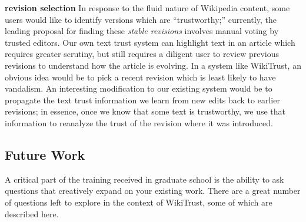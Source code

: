 \textbf{revision selection}
   In response to the fluid nature of Wikipedia content,
    some users would like to identify versions which
    are ``trustworthy;'' currently, the leading proposal
    for finding these \textit{stable revisions}
    involves manual voting by trusted editors.
    Our own text trust system can highlight text in
    an article which requires greater scrutiny, but
    still requires a diligent user to review previous
    revisions to understand how the article is evolving.
    In a system like WikiTrust, an obvious idea would be to pick
    a recent revision which is least likely to have vandalism.
    An interesting modification to our existing system would be
    to propagate the text trust information we learn from new edits
    back to earlier revisions; in essence, once we know that some
    text is trustworthy, we use that information to reanalyze the
    trust of the revision where it was introduced.


\subsection{Future Work}

A critical part of the training received in graduate school
is the ability to ask questions that creatively expand on your
existing work.
There are a great number of questions left to explore in the
context of WikiTrust, some of which are described here.

